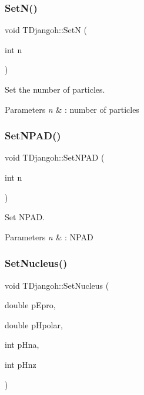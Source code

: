 \subsubsection{\texorpdfstring{Set\+N()}{SetN()}}
{\footnotesize\ttfamily void T\+Djangoh\+::\+SetN (\begin{DoxyParamCaption}\item[{int}]{n }\end{DoxyParamCaption})\hspace{0.3cm}{\ttfamily [inline]}}



Set the number of particles. 


\begin{DoxyParams}{Parameters}
{\em n} & \+: number of particles \\
\hline
\end{DoxyParams}
\mbox{\label{class_t_djangoh_a0ed7bb7e7433a6385b5838ce519168a2}} 
\subsubsection{\texorpdfstring{Set\+N\+P\+A\+D()}{SetNPAD()}}
{\footnotesize\ttfamily void T\+Djangoh\+::\+Set\+N\+P\+AD (\begin{DoxyParamCaption}\item[{int}]{n }\end{DoxyParamCaption})\hspace{0.3cm}{\ttfamily [inline]}}



Set N\+P\+AD. 


\begin{DoxyParams}{Parameters}
{\em n} & \+: N\+P\+AD \\
\hline
\end{DoxyParams}
\mbox{\label{class_t_djangoh_ad619dbb20d8cdc822f664e434ecad0aa}} 
\subsubsection{\texorpdfstring{Set\+Nucleus()}{SetNucleus()}}
{\footnotesize\ttfamily void T\+Djangoh\+::\+Set\+Nucleus (\begin{DoxyParamCaption}\item[{double}]{p\+Epro,  }\item[{double}]{p\+Hpolar,  }\item[{int}]{p\+Hna,  }\item[{int}]{p\+Hnz }\end{DoxyParamCaption})}

